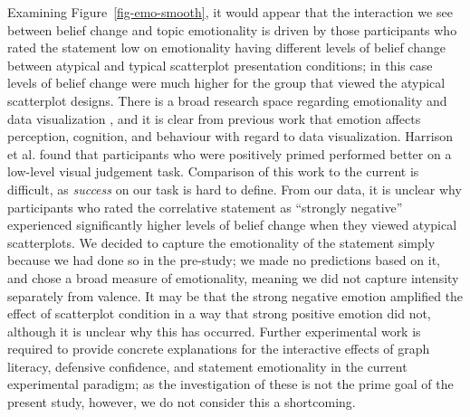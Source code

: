 \documentclass[manuscript,screen,review,anonymous]{acmart}
\begin{document}
Examining Figure~\ref{fig-emo-smooth}, it would appear that the
interaction we see between belief change and topic emotionality is
driven by those participants who rated the statement low on emotionality
having different levels of belief change between atypical and typical
scatterplot presentation conditions; in this case levels of belief
change were much higher for the group that viewed the atypical
scatterplot designs. There is a broad research space regarding
emotionality and data visualization \citep{lan_2023}, and it is clear
from previous work that emotion affects perception, cognition, and
behaviour \citep{phelps_2006, harrison_2013, thoresen_2016} with regard
to data visualization. Harrison et al. \citep{harrison_2013} found that
participants who were positively primed performed better on a low-level
visual judgement task. Comparison of this work to the current is
difficult, as \emph{success} on our task is hard to define. From our
data, it is unclear why participants who rated the correlative statement
as ``strongly negative'' experienced significantly higher levels of
belief change when they viewed atypical scatterplots. We decided to
capture the emotionality of the statement simply because we had done so
in the pre-study; we made no predictions based on it, and chose a broad
measure of emotionality, meaning we did not capture intensity separately
from valence. It may be that the strong negative emotion amplified the
effect of scatterplot condition in a way that strong positive emotion
did not, although it is unclear why this has occurred. Further
experimental work is required to provide concrete explanations for the
interactive effects of graph literacy, defensive confidence, and
statement emotionality in the current experimental paradigm; as the
investigation of these is not the prime goal of the present study,
however, we do not consider this a shortcoming.
\end{document}
